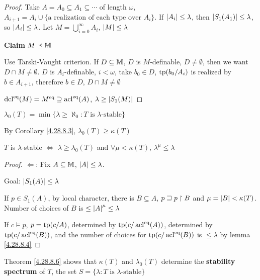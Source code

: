 \documentclass[11pt]{article}
\begin{document}
\begin{proof}
Take \(A=A_0\subseteq A_1\subseteq\cdots\) of length \(\omega\), \(A_{i+1}=A_i\cup\{\text{a realization of each type over }A_i\}\).
If \(\abs{A_i}\le\lambda\), then \(\abs{S_1(A_1)}\le\lambda\), so \(\abs{A_i}\le\lambda\).
Let \(M=\bigcup_{i=0}^\infty A_i\), \(\abs{M}\le\lambda\)

\textbf{Claim} \(M\preceq\mathbb{M}\)

Use Tarski-Vaught criterion. If \(D\subseteq\mathbb{M}\), \(D\) is \(M\)-definable, \(D\neq\emptyset\), then we
want \(D\cap M\neq\emptyset\). \(D\) is \(A_i\)-definable, \(i<\omega\), take \(b_0\in D\), \(\operatorname{tp}(b_0/A_i)\) is
realized by \(b\in A_{i+1}\), therefore \(b\in D\), \(D\cap M\neq\emptyset\)

\(\operatorname{dcl}^{\operatorname{eq}}(M)=M^{\operatorname{eq}}\supseteq\operatorname{acl}^{\operatorname{eq}}(A)\), \(\lambda\ge\abs{S_1(M)}\)
\end{proof}

\begin{definition}[]
\(\lambda_0(T)=\min\{\lambda\ge\aleph_0:T\text{ is $\lambda$-stable}\}\)
\end{definition}

By Corollary \ref{4.28.8.3}, \(\lambda_0(T)\ge\kappa(T)\)

\begin{theorem}[]
\label{4.28.8.6}
\(T\) is \(\lambda\)-stable \(\Leftrightarrow\) \(\lambda\ge\lambda_0(T)\) and \(\forall \mu<\kappa(T)\), \(\lambda^\mu\le\lambda\)
\end{theorem}

\begin{proof}
\(\Leftarrow\): Fix \(A\subseteq\mathbb{M}\), \(\abs{A}\le\lambda\).

Goal: \(\abs{S_1(A)}\le\lambda\)

If \(p\in S_1(A)\), by local character, there is \(B\subseteq A\), \(p\sqsupseteq p\upharpoonright B\) and \(\mu=\abs{B}<\kappa(T)\).
Number of choices of \(B\) is \(\le\abs{A}^\mu\le\lambda\)

If \(c\vDash p\), \(p=\operatorname{tp}(c/A)\), determined by \(\operatorname{tp}(c/\operatorname{acl}^{\operatorname{eq}}(A))\), determined
by \(\operatorname{tp}(c/\operatorname{acl}^{\operatorname{eq}}(B))\), and the number of choices for \(\operatorname{tp}(c/\operatorname{acl}^{\operatorname{eq}}(B))\)
is \(\le\lambda\) by lemma \ref{4.28.8.4}
\end{proof}

\begin{remark}
Theorem \ref{4.28.8.6} shows that \(\kappa(T)\) and \(\lambda_0(T)\) determine the \textbf{stability spectrum}
of \(T\), the set \(S=\{\lambda:T\text{ is $\lambda$-stable}\}\)
\end{remark}
\end{document}

